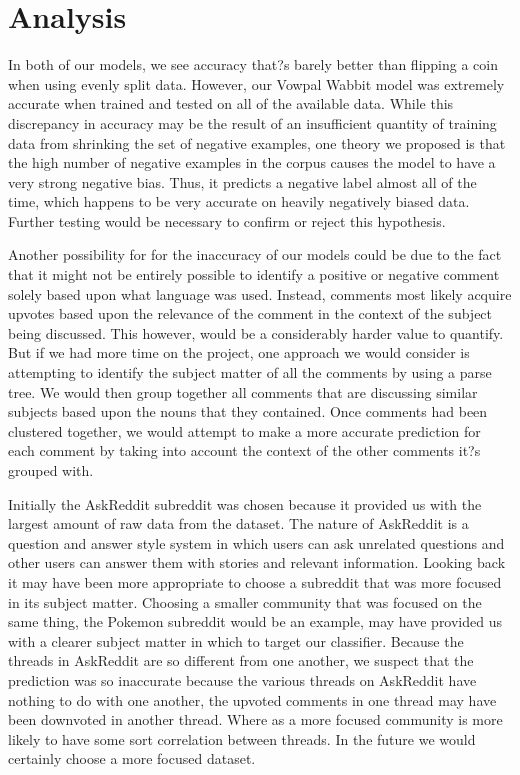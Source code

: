 \documentclass{article}
\begin{document}
\section{Analysis} 
In both of our models, we see accuracy that?s barely better than flipping a coin when using evenly split data. However, our Vowpal Wabbit model was extremely accurate when trained and tested on all of the available data. While this discrepancy in accuracy may be the result of an insufficient quantity of training data from shrinking the set of negative examples, one theory we proposed is that the high number of negative examples in the corpus causes the model to have a very strong negative bias. Thus, it predicts a negative label almost all of the time, which happens to be very accurate on heavily negatively biased data. Further testing would be necessary to confirm or reject this hypothesis. 


Another possibility for for the inaccuracy of our models could be due to the fact that it might not be entirely possible to identify a positive or negative comment solely based upon what language was used. Instead, comments most likely acquire upvotes based upon the relevance of the comment in the context of the subject being discussed. This however, would be a considerably harder value to quantify. But if we had more time on the project, one approach we would consider is attempting to identify the subject matter of all the comments by using a parse tree. We would then group together all comments that are discussing similar subjects based upon the nouns that they contained. Once comments had been clustered together, we would attempt to make a more accurate prediction for each comment by taking into account the context of the other comments it?s grouped with.


Initially the AskReddit subreddit was chosen because it provided us with the largest amount of raw data from the dataset. The nature of AskReddit is a question and answer style system in which users can ask unrelated questions and other users can answer them with stories and relevant information. Looking back it may have been more appropriate to choose a subreddit that was more focused in its subject matter. Choosing a smaller community that was focused on the same thing, the Pokemon subreddit would be an example, may have provided us with a clearer subject matter in which to target our classifier. Because the threads in AskReddit are so different from one another, we suspect that the prediction was so inaccurate because the various threads on AskReddit have nothing to do with one another, the upvoted comments in one thread may have been downvoted in another thread. Where as a more focused community is more likely to have some sort correlation between threads. In the future we would certainly choose a more focused dataset. 
\end{document}
